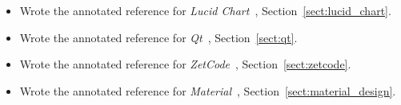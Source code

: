 \begin{itemize}
\begin{itemize}
            \item {Wrote the annotated reference for \emph{Lucid Chart}~\cite{LUCID_CHART:2}, Section~\ref{sect:lucid_chart}.}
            \item {Wrote the annotated reference for \emph{Qt}~\cite{QT:3}, Section~\ref{sect:qt}.}
            \item {Wrote the annotated reference for \emph{ZetCode}~\cite{ZETCODE:4}, Section~\ref{sect:zetcode}.}
            \item {Wrote the annotated reference for \emph{Material}~\cite{MATERIAL:7}, Section~\ref{sect:material_design}.}
        \end{itemize}
\end{itemize}

